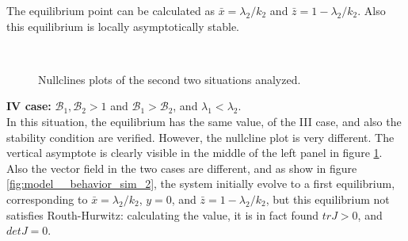 The equilibrium point can be calculated as $\bar{x}= \lambda_2/k_2$ and $\bar{z} = 1 - \lambda_2/k_2$. 
Also this equilibrium is locally asymptotically stable. 
\begin{figure}[h]
	\centering
	 \quad
	 \\
	\caption[Nullclines second figure]{Nullclines plots of the second two situations analyzed.}
	\label{fig:nullcline_B1_mag_B2}
\end{figure}

\textbf{IV case: } $\mathcal{B}_1, \mathcal{B}_2 >1$ and $\mathcal{B}_1 >  \mathcal{B}_2$, and $\lambda_1 < \lambda_2$. \\
In this situation, the equilibrium has the same value, of the III case, and also the stability condition are verified. However, the nullcline plot is very different. The vertical asymptote is clearly visible in the middle of the left panel in figure \ref{fig:nullcline_B1_mag_B2}. Also the vector field in the two cases are different, and as show in figure \ref{fig:model__behavior_sim_2}, the system initially evolve to a first equilibrium, corresponding to $\bar{x} = \lambda_2/k_2$, $y = 0$, and $\bar{z} = 1 - \lambda_2/k_2$, but this equilibrium not satisfies Routh-Hurwitz: calculating the value, it is in fact found $trJ > 0$, and $detJ= 0$.


